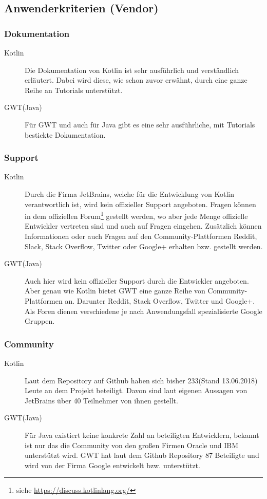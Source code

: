 \subsection{Anwenderkriterien (Vendor)}
\subsubsection{Dokumentation}
\begin{description}
	\item[Kotlin] Die Dokumentation von Kotlin ist sehr ausführlich und verständlich erläutert. Dabei wird diese, wie schon zuvor erwähnt, durch eine ganze Reihe an Tutorials unterstützt. \cite{kotlinReference}
	\item[GWT(Java)] Für \gls{GWT} und auch für Java gibt es eine sehr ausführliche, mit Tutorials bestickte Dokumentation. \cite{gwtDevGuide, javaDoc}
\end{description}

\subsubsection{Support}
\begin{description}
	\item[Kotlin] Durch die Firma JetBrains, welche für die Entwicklung von Kotlin verantwortlich ist, wird kein offizieller Support angeboten. Fragen können in dem offiziellen Forum\footnote{siehe \url{https://discuss.kotlinlang.org/}} gestellt werden, wo aber jede Menge offizielle Entwickler vertreten sind und auch auf Fragen eingehen. Zusätzlich können Informationen oder auch Fragen auf den Community-Plattformen Reddit, Slack, Stack Overflow, Twitter oder Google+ erhalten bzw. gestellt werden. \cite{kotlinCommunity}
	\item[GWT(Java)] Auch hier wird kein offizieller Support durch die Entwickler angeboten. Aber genau wie Kotlin bietet \gls{GWT} eine ganze Reihe von Community-Plattformen an. Darunter Reddit, Stack Overflow, Twitter und Google+. Als Foren dienen verschiedene je nach Anwendungsfall spezialisierte Google Gruppen. \cite{gwtCommunity}
\end{description}

\subsubsection{Community}
\begin{description}
	\item[Kotlin] Laut dem Repository auf Github haben sich bisher 233(Stand 13.06.2018) Leute an dem Projekt beteiligt. Davon sind laut eigenen Aussagen von JetBrains über 40 Teilnehmer von ihnen gestellt. \cite{kotlinWhoDevelops}
	\item[GWT(Java)] Für Java existiert keine konkrete Zahl an beteiligten Entwicklern, bekannt ist nur das die Community von den großen Firmen Oracle und IBM unterstützt wird. \gls{GWT} hat laut dem Github Repository 87 Beteiligte und wird von der Firma Google entwickelt bzw. unterstützt. \cite{oracleIBMCollaborate, gwtTerms}
\end{description}


